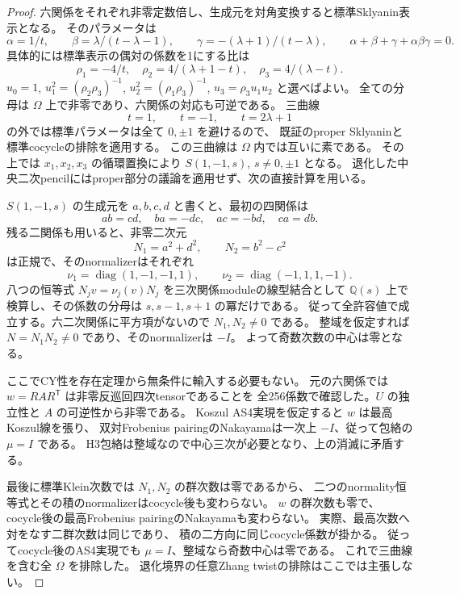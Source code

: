 \begin{proof}
六関係をそれぞれ非零定数倍し、生成元を対角変換すると標準Sklyanin表示となる。
そのパラメータは
\[
 \alpha=1/t,\qquad \beta=\lambda/(t-\lambda-1),\qquad
 \gamma=-(\lambda+1)/(t-\lambda),
 \qquad\alpha+\beta+\gamma+\alpha\beta\gamma=0.
\]
具体的には標準表示の偶対の係数を1にする比は
\[
 \rho_1=-4/t,\quad \rho_2=4/(\lambda+1-t),\quad \rho_3=4/(\lambda-t).
\]
$u_0=1$, $u_1^2=(\rho_2\rho_3)^{-1}$,
$u_2^2=(\rho_1\rho_3)^{-1}$, $u_3=\rho_3u_1u_2$ と選べばよい。
全ての分母は $\Omega$ 上で非零であり、六関係の対応も可逆である。
三曲線
\[
 t=1,\qquad t=-1,\qquad t=2\lambda+1
\]
の外では標準パラメータは全て $0,\pm1$ を避けるので、
既証のproper Sklyaninと標準cocycleの排除を適用する。
この三曲線は $\Omega$ 内では互いに素である。
その上では $x_1,x_2,x_3$ の循環置換により
$S(1,-1,s)$, $s\ne0,\pm1$ となる。
退化した中央二次pencilにはproper部分の議論を適用せず、次の直接計算を用いる。

$S(1,-1,s)$ の生成元を $a,b,c,d$ と書くと、最初の四関係は
\[
 ab=cd,\quad ba=-dc,\quad ac=-bd,\quad ca=db.
\]
残る二関係も用いると、非零二次元
\[
 N_1=a^2+d^2,\qquad N_2=b^2-c^2
\]
は正規で、そのnormalizerはそれぞれ
\[
 \nu_1=\operatorname{diag}(1,-1,-1,1),\qquad
 \nu_2=\operatorname{diag}(-1,1,1,-1).
\]
八つの恒等式 $N_jv=\nu_j(v)N_j$ を三次関係moduleの線型結合として
$\mathbb Q(s)$ 上で検算し、その係数の分母は $s,s-1,s+1$ の冪だけである。
従って全許容値で成立する。六二次関係に平方項がないので $N_1,N_2\ne0$ である。
整域を仮定すれば $N=N_1N_2\ne0$ であり、そのnormalizerは $-I$。
よって奇数次数の中心は零となる。

ここでCY性を存在定理から無条件に輸入する必要もない。
元の六関係では $w=R A R^{\mathsf T}$ は非零反巡回四次tensorであることを
全256係数で確認した。$U$ の独立性と $A$ の可逆性から非零である。
Koszul AS4実現を仮定すると $w$ は最高Koszul線を張り、
双対Frobenius pairingのNakayamaは一次上 $-I$、従って包絡の $\mu=I$ である。
H3包絡は整域なので中心三次が必要となり、上の消滅に矛盾する。

最後に標準Klein次数では $N_1,N_2$ の群次数は零であるから、
二つのnormality恒等式とその積のnormalizerはcocycle後も変わらない。
$w$ の群次数も零で、cocycle後の最高Frobenius pairingのNakayamaも変わらない。
実際、最高次数へ対をなす二群次数は同じであり、
積の二方向に同じcocycle係数が掛かる。
従ってcocycle後のAS4実現でも $\mu=I$、整域なら奇数中心は零である。
これで三曲線を含む全 $\Omega$ を排除した。
退化境界の任意Zhang twistの排除はここでは主張しない。
\end{proof}

